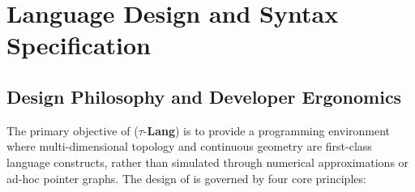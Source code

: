 \chapter{Language Design and Syntax Specification}
\label{ch:lang_design}

\section{Design Philosophy and Developer Ergonomics}
\label{sec:design_philosophy}

The primary objective of \ToposLang{} ($\tau$-\textbf{Lang}) is to provide a programming environment where multi-dimensional topology and continuous geometry are first-class language constructs, rather than simulated through numerical approximations or ad-hoc pointer graphs. The design of \ToposLang{} is governed by four core principles:

